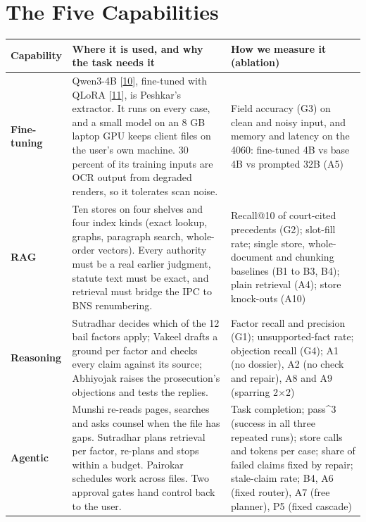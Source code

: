 \documentclass[10pt,a4paper]{article}
\begin{document}
\section{The Five Capabilities}

{\small
\begin{xltabular}{\linewidth}{@{}>{\raggedright\arraybackslash{}\hsize}X>{\raggedright\arraybackslash{}\hsize}X>{\raggedright\arraybackslash{}\hsize}X@{}}
\toprule
\textbf{Capability} & \textbf{Where it is used, and why the task needs it} & \textbf{How we measure it (ablation)} \\
\midrule
\endhead
\textbf{Fine-tuning} & Qwen3-4B [\href{https://arxiv.org/abs/2505.09388}{10}], fine-tuned with QLoRA [\href{https://arxiv.org/abs/2305.14314}{11}], is Peshkar's extractor. It runs on every case, and a small model on an 8 GB laptop GPU keeps client files on the user's own machine. 30 percent of its training inputs are OCR output from degraded renders, so it tolerates scan noise. & Field accuracy (G3) on clean and noisy input, and memory and latency on the 4060: fine-tuned 4B vs base 4B vs prompted 32B (A5) \\
\textbf{RAG} & Ten stores on four shelves and four index kinds (exact lookup, graphs, paragraph search, whole-order vectors). Every authority must be a real earlier judgment, statute text must be exact, and retrieval must bridge the IPC to BNS renumbering. & Recall@10 of court-cited precedents (G2); slot-fill rate; single store, whole-document and chunking baselines (B1 to B3, B4); plain retrieval (A4); store knock-outs (A10) \\
\textbf{Reasoning} & Sutradhar decides which of the 12 bail factors apply; Vakeel drafts a ground per factor and checks every claim against its source; Abhiyojak raises the prosecution's objections and tests the replies. & Factor recall and precision (G1); unsupported-fact rate; objection recall (G4); A1 (no dossier), A2 (no check and repair), A8 and A9 (sparring 2$\times$2) \\
\textbf{Agentic} & Munshi re-reads pages, searches and asks counsel when the file has gaps. Sutradhar plans retrieval per factor, re-plans and stops within a budget. Pairokar schedules work across files. Two approval gates hand control back to the user. & Task completion; pass\textasciicircum{}3 (success in all three repeated runs); store calls and tokens per case; share of failed claims fixed by repair; stale-claim rate; B4, A6 (fixed router), A7 (free planner), P5 (fixed cascade) \\

\end{xltabular}}
\end{document}
